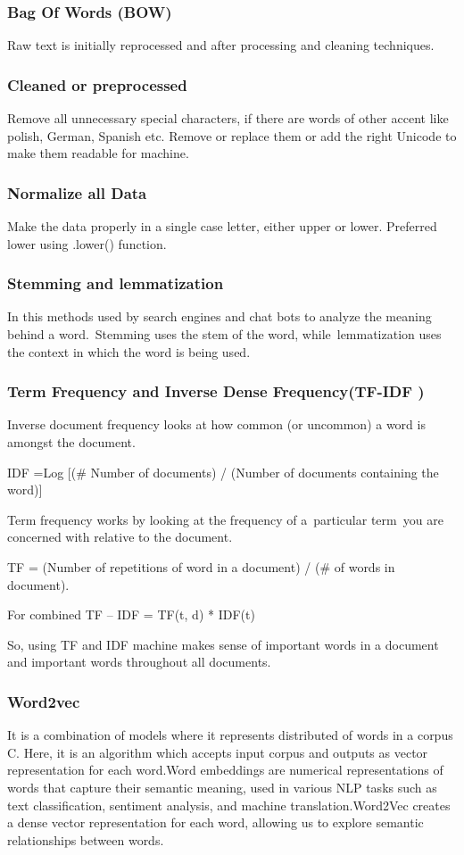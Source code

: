 \subsubsection{Bag Of Words (BOW)}
Raw text is initially reprocessed and after processing and cleaning techniques.
\subsubsection{Cleaned or preprocessed }
Remove all unnecessary special characters, if there are words of other accent like polish, German, Spanish etc. Remove or replace them or add the right Unicode to make them readable for machine. 
\subsubsection{Normalize all Data}
Make the data properly in a single case letter, either upper or lower. Preferred lower using .lower() function.
\subsubsection{Stemming and lemmatization}
In this methods used by search engines and chat bots to analyze the meaning behind a word. Stemming uses the stem of the word, while lemmatization uses the context in which the word is being used.

\subsubsection{Term Frequency and Inverse Dense Frequency(TF-IDF )}

Inverse document frequency looks at how common (or uncommon) a word is amongst the document.

IDF =Log [(\# Number of documents) / (Number of documents containing the word)]

Term frequency works by looking at the frequency of a particular term you are concerned with relative to the document.

	 TF = (Number of repetitions of word in a document) / (\# of words in document).
  
For combined TF – IDF = TF(t, d) * IDF(t)

So, using TF and IDF machine makes sense of important words in a document and important words throughout all documents.

\subsubsection{Word2vec}
It is a combination of models where it represents distributed of words in a corpus C. Here, it is an algorithm which accepts  input corpus and outputs as vector representation for each word.Word embeddings are numerical representations of words that capture their semantic meaning, used in various NLP tasks such as text classification, sentiment analysis, and machine translation.Word2Vec creates a dense vector representation for each word, allowing us to explore semantic relationships between words.
